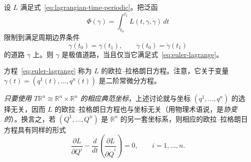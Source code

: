 \begin{proposition}
\label{prop:euler-lagrange-periodic}
设 $L$ 满足式~\eqref{eq:lagrangian-time-periodic}。把泛函
\[
  \Phi(\gamma)=\int_{t_0}^{t_1}L(t,\gamma,\dot\gamma)\,dt
\]
限制到满足周期边界条件
\[
  \gamma(t_0)=\gamma(t_1),\qquad\dot\gamma(t_0)=\dot\gamma(t_1)
\]
的道路 $\gamma$ 上。则 $\gamma$ 是极值道路，当且仅当它满足式~\eqref{eq:euler-lagrange}。
\end{proposition}

方程~\eqref{eq:euler-lagrange} 称为 $L$ 的欧拉--拉格朗日方程。注意，它关于变量 $\gamma(t)=(q^1(t),\ldots,q^n(t))$ 是二阶常微分方程。

\begin{remark}
\label{rem:euler-lagrange-covariance}
\emph{只要使用 $T\mathbb R^n\cong\mathbb R^n\times\mathbb R^n$ 的相应典范坐标}，上述讨论就与坐标 $(q^1,\ldots,q^n)$ 的选择无关，因而 $L$ 的欧拉--拉格朗日方程也与坐标无关（用物理术语说，是\emph{协变的}）。换言之，若 $(Q^1,\ldots,Q^n)$ 是 $\mathbb R^n$ 的另一套坐标系，则相应的欧拉--拉格朗日方程具有同样的形式
\[
  \frac{\partial L}{\partial Q^i}
  -\frac d{dt}\left(\frac{\partial L}{\partial\dot Q^i}\right)=0,
  \qquad i=1,\ldots,n.
\]
\end{remark}

